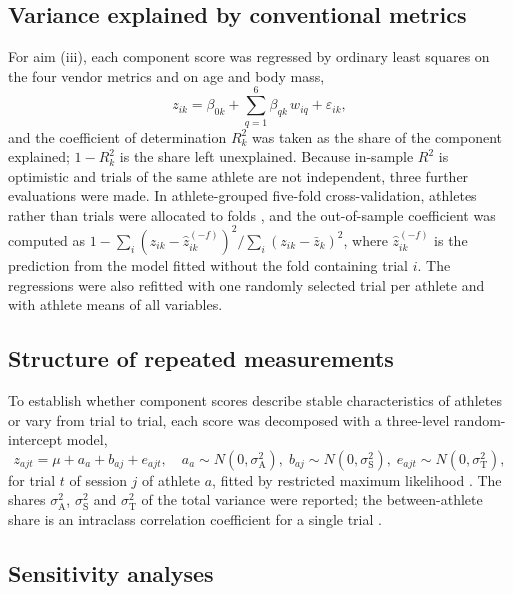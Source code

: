 \subsection{Variance explained by conventional metrics}

For aim (iii), each component score was regressed by ordinary least squares on the four vendor metrics and on age and body mass,
\begin{equation}
z_{ik} = \beta_{0k} + \sum_{q=1}^{6}\beta_{qk}\,w_{iq} + \varepsilon_{ik},
\end{equation}
and the coefficient of determination $R^2_k$ was taken as the share of the component explained; $1 - R^2_k$ is the share left unexplained. Because in-sample $R^2$ is optimistic and trials of the same athlete are not independent, three further evaluations were made. In athlete-grouped five-fold cross-validation, athletes rather than trials were allocated to folds \citep{roberts2017}, and the out-of-sample coefficient was computed as $1 - \sum_i (z_{ik} - \hat z^{(-f)}_{ik})^2 / \sum_i (z_{ik} - \bar z_k)^2$, where $\hat z^{(-f)}_{ik}$ is the prediction from the model fitted without the fold containing trial $i$. The regressions were also refitted with one randomly selected trial per athlete and with athlete means of all variables.

\subsection{Structure of repeated measurements}

To establish whether component scores describe stable characteristics of athletes or vary from trial to trial, each score was decomposed with a three-level random-intercept model,
\begin{equation}
z_{ajt} = \mu + a_a + b_{aj} + e_{ajt}, \quad a_a \sim N(0, \sigma^2_{\mathrm{A}}),\; b_{aj} \sim N(0, \sigma^2_{\mathrm{S}}),\; e_{ajt} \sim N(0, \sigma^2_{\mathrm{T}}),
\end{equation}
for trial $t$ of session $j$ of athlete $a$, fitted by restricted maximum likelihood \citep{pinheiro2000}. The shares $\sigma^2_{\mathrm{A}}$, $\sigma^2_{\mathrm{S}}$ and $\sigma^2_{\mathrm{T}}$ of the total variance were reported; the between-athlete share is an intraclass correlation coefficient for a single trial \citep{hopkins2000,koo2016}.

\subsection{Sensitivity analyses}

